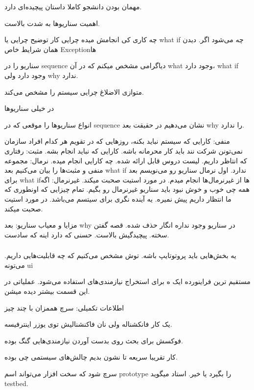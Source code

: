 مهمان بودن دانشجو کاملا داستان پیچیده‌ای دارد.

اهمیت سناریو‌ها به شدت بالاست.

چه کاری
کی انجامش میده
چرایی کار 
توضیح چرایی یا what if چه می‌شود اگر. دیدن همان شرایط خاص Exceptionها

سناریو را در sequence دیاگرامی مشخص میکنم که در آن what وجود دارد، what if وجود
دارد ولی why ندارد.

متوازی الاضلاغ چرایی سیستم را مشخص می‌کند.

در خیلی سناریو‌ها 

انواع سناریو‌ها را موقعی که در sequence نشان می‌دهیم در حقیقت بعد why را ندارد.

منفی: کارایی که سیستم نباید بکنه، روز‌هایی که در تقویم هر کدام افراد سازمان
نمی‌تونن شرکت نند باید کار محرمانه باشه. کارایی که نباید انجام بشه.
مثبت: رفتاری که انتاظر داریم. لیست دروس قابل ارائه شده. چه کارایی انجام میده.
نرمال: مجموعه منفی و مثبت‌ها را بیان می‌کنیم بعد what if ندارد. اول نرمال سناریو
رو می‌نویسم بعد برای what ifها از غیرنرمال‌ها انجام میدم. در مورد استیت صحبت میکند.
غیرنرمال: اگه همه چی خوب و خوش نبود باید سناریو غیرنرمال رو بگیم. تمام چیزایی که
اونطوری که ما انتظار داریم پیش نمیره. یه آینده نگری برای سیتسم می‌باشد. در مورد
استیت صحبت میکند.

مزایا و معیاب سناریو:
بعد why در سناریو وجود نداره انگار حذف شده.
قصه گفتن سخته. پیچیدگیش بالاست.
حسنی که دارد اینه که سادست.


\subsubsection{}

یه بخش‌هایی باید پروتوتایپ باشه. توش مشخص می‌کنیم که چه قابلیت‌هایی داریم.
می‌تونه ui

مستقیم ترین فراینورده ایک ه برای استخراج نیازمندی‌های استفاده می‌شود. عملیاتی در
این قسمت بیشتر دیده میشن.

اطلاعات تکمیلی:
سرچ هممزان با چند چیز

یک کار فانکشناله ولی نان فاکنشنالیش توی یوزر اینترفیسه.

فوکسش برای بحث روی بدست آوردن نیازمندی‌هایی گنگ بوده.

کار تقریبا سریعه تا نشون بدیم چالش‌های سیستمی چی بوده.

سرچ شود که سخت افزار می‌تواند اسم prototype را بگیرد یا خیر. استاد میگوید
testbed.

\subsubsection{}

